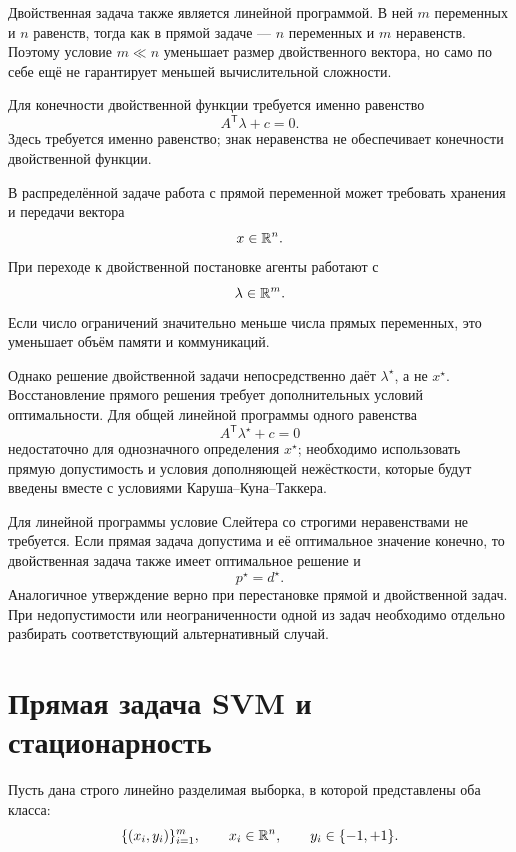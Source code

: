 Двойственная задача также является линейной программой. В ней
\(m\) переменных и \(n\) равенств, тогда как в прямой задаче ---
\(n\) переменных и \(m\) неравенств. Поэтому условие \(m\ll n\)
уменьшает размер двойственного вектора, но само по себе ещё не
гарантирует меньшей вычислительной сложности.

\begin{remark}
Для конечности двойственной функции требуется именно равенство
\[
    A^{\mathsf T}\lambda+c=0.
\]
Здесь требуется именно равенство; знак неравенства не обеспечивает конечности двойственной функции.
\end{remark}



В распределённой задаче работа с прямой переменной может требовать
хранения и передачи вектора
\[
    x\in\mathbb{R}^n.
\]
При переходе к двойственной постановке агенты работают с
\[
    \lambda\in\mathbb{R}^m.
\]
Если число ограничений значительно меньше числа прямых переменных,
это уменьшает объём памяти и коммуникаций.

Однако решение двойственной задачи непосредственно даёт
\(\lambda^\star\), а не \(x^\star\). Восстановление прямого решения
требует дополнительных условий оптимальности. Для общей линейной
программы одного равенства
\[
    A^{\mathsf T}\lambda^\star+c=0
\]
недостаточно для однозначного определения \(x^\star\); необходимо
использовать прямую допустимость и условия дополняющей нежёсткости,
которые будут введены вместе с условиями Каруша--Куна--Таккера.

\begin{remark}
Для линейной программы условие Слейтера со строгими неравенствами не
требуется. Если прямая задача допустима и её оптимальное значение
конечно, то двойственная задача также имеет оптимальное решение и
\[
    p^\star=d^\star.
\]
Аналогичное утверждение верно при перестановке прямой и двойственной
задач. При недопустимости или неограниченности одной из задач
необходимо отдельно разбирать соответствующий альтернативный случай.
\end{remark}

\section{Прямая задача SVM и стационарность}

Пусть дана строго линейно разделимая выборка, в которой представлены
оба класса:
\[
    \{(x_i,y_i)\}_{i=1}^{m},
    \qquad
    x_i\in\mathbb{R}^n,
    \qquad
    y_i\in\{-1,+1\}.
\]

